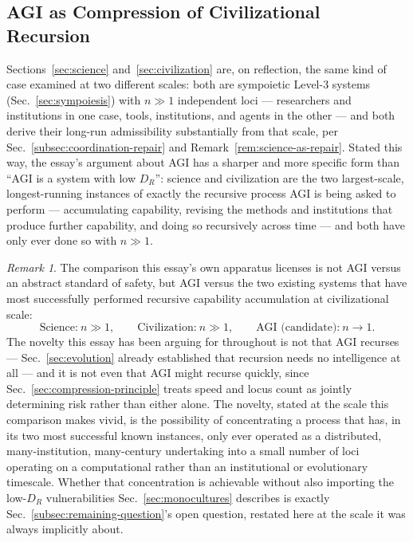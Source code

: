 \documentclass[11pt,a4paper]{article}
\theoremstyle{plain}
\theoremstyle{definition}
\theoremstyle{remark}
\newtheorem{remark}[theorem]{Remark}
\newcommand{\DR}{D_R}
\begin{document}
\subsection{AGI as Compression of Civilizational Recursion}
\label{subsec:agi-civilizational-compression}

Sections~\ref{sec:science} and~\ref{sec:civilization} are, on reflection, the same kind of case examined at two different scales: both are sympoietic Level-3 systems (Sec.~\ref{sec:sympoiesis}) with $n \gg 1$ independent loci — researchers and institutions in one case, tools, institutions, and agents in the other — and both derive their long-run admissibility substantially from that scale, per Sec.~\ref{subsec:coordination-repair} and Remark~\ref{rem:science-as-repair}. Stated this way, the essay's argument about AGI has a sharper and more specific form than ``AGI is a system with low $\DR$'': science and civilization are the two largest-scale, longest-running instances of exactly the recursive process AGI is being asked to perform — accumulating capability, revising the methods and institutions that produce further capability, and doing so recursively across time — and both have only ever done so with $n \gg 1$.

\begin{remark}
The comparison this essay's own apparatus licenses is not AGI versus an abstract standard of safety, but AGI versus the two existing systems that have most successfully performed recursive capability accumulation at civilizational scale:
\[
\text{Science:}\ n \gg 1, \qquad \text{Civilization:}\ n \gg 1, \qquad \text{AGI (candidate):}\ n \to 1.
\]
The novelty this essay has been arguing for throughout is not that AGI recurses — Sec.~\ref{sec:evolution} already established that recursion needs no intelligence at all — and it is not even that AGI might recurse quickly, since Sec.~\ref{sec:compression-principle} treats speed and locus count as jointly determining risk rather than either alone. The novelty, stated at the scale this comparison makes vivid, is the possibility of concentrating a process that has, in its two most successful known instances, only ever operated as a distributed, many-institution, many-century undertaking into a small number of loci operating on a computational rather than an institutional or evolutionary timescale. Whether that concentration is achievable without also importing the low-$\DR$ vulnerabilities Sec.~\ref{sec:monocultures} describes is exactly Sec.~\ref{subsec:remaining-question}'s open question, restated here at the scale it was always implicitly about.
\end{remark}
\end{document}
